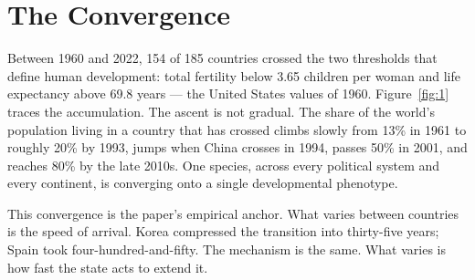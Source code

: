\documentclass[12pt,letterpaper]{article}
\begin{document}
\begin{titlepage}
\begin{abstract}
A great-great-grandparent's school completion predicts their
great-great-grandchild's child-survival outcomes a century later;
income's predictive power collapses within one. Income, once education's
contribution is removed, predicts nothing. Provision without educated
populations produces no durable outcomes. Institutions are built by
educated populations, not the reverse. Wallace's theory explained how
species differentiate; I document the inverse --- the
convergence of one species, across every political system and
continent, onto the same developmental phenotype through a single
biological channel.

\vspace{0.5em}
\noindent\textbf{Keywords:} extended juvenile dependency; cultural
transmission; parental transmission; intergenerational transmission;
categorical literacy; mass schooling; human development;
residualization; development threshold
\end{abstract}

\thispagestyle{empty}
\end{titlepage}

\setcounter{page}{2}

\newpage

\section{The Convergence}\label{the-convergence}

Between 1960 and 2022, 154 of 185 countries crossed the two thresholds
that define human development: total fertility below 3.65 children per
woman and life expectancy above 69.8 years --- the United States
values of 1960. Figure~\ref{fig:1} traces the accumulation. The ascent
is not gradual. The share of the world's population living in a
country that has crossed climbs slowly from 13\% in 1961 to roughly
20\% by 1993, jumps when China crosses in 1994, passes 50\% in 2001,
and reaches 80\% by the late 2010s. One species, across every
political system and every continent, is converging onto a single
developmental phenotype.

This convergence is the paper's empirical anchor. What varies between
countries is the speed of arrival. Korea compressed the transition
into thirty-five years; Spain took four-hundred-and-fifty. The
mechanism is the same. What varies is how fast the state acts to
extend it.
\end{document}
